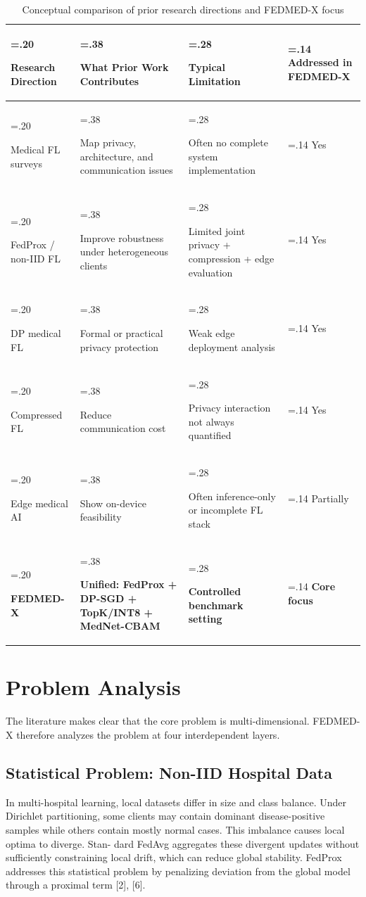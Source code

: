 \documentclass[12pt,a4paper]{report}
\begin{document}
\begin{table}[htbp]
\centering
\small
\caption{Conceptual comparison of prior research directions and FEDMED-X focus}
\begin{tabularx}{\textwidth}{|>{\hsize=.20\hsize\raggedright\arraybackslash}X|>{\hsize=.38\hsize\raggedright\arraybackslash}X|>{\hsize=.28\hsize\raggedright\arraybackslash}X|>{\hsize=.14\hsize\centering\arraybackslash}X|}
\hline
\textbf{Research Direction} & \textbf{What Prior Work Contributes} & \textbf{Typical Limitation} & \textbf{Addressed in FEDMED-X} \\
\hline
Medical FL surveys & Map privacy, architecture, and communication issues & Often no complete system implementation & Yes \\
\hline
FedProx / non-IID FL & Improve robustness under heterogeneous clients & Limited joint privacy + compression + edge evaluation & Yes \\
\hline
DP medical FL & Formal or practical privacy protection & Weak edge deployment analysis & Yes \\
\hline
Compressed FL & Reduce communication cost & Privacy interaction not always quantified & Yes \\
\hline
Edge medical AI & Show on-device feasibility & Often inference-only or incomplete FL stack & Partially \\
\hline
\textbf{FEDMED-X} & \textbf{Unified: FedProx + DP-SGD + TopK/INT8 + MedNet-CBAM} & \textbf{Controlled benchmark setting} & \textbf{Core focus} \\
\hline
\end{tabularx}
\end{table}

\section{Problem Analysis}
The literature makes clear that the core problem is multi-dimensional. FEDMED-X therefore analyzes the problem at four interdependent layers.
\subsection{Statistical Problem: Non-IID Hospital Data}
In multi-hospital learning, local datasets differ in size and class balance. Under Dirichlet partitioning, some clients may contain dominant disease-positive samples while others contain mostly normal cases. This imbalance causes local optima to diverge. Stan- dard FedAvg aggregates these divergent updates without sufficiently constraining local drift, which can reduce global stability. FedProx addresses this statistical problem by penalizing deviation from the global model through a proximal term [2], [6].
\end{document}
